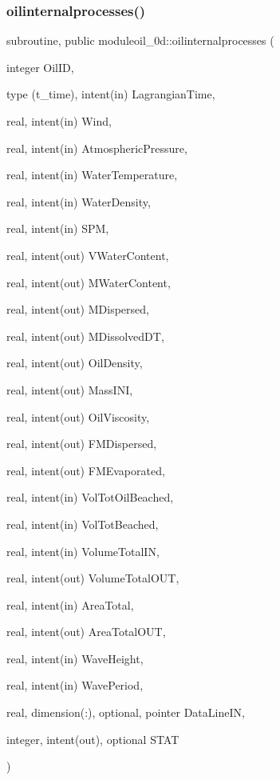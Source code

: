 \subsubsection{\texorpdfstring{oilinternalprocesses()}{oilinternalprocesses()}}
{\footnotesize\ttfamily subroutine, public moduleoil\+\_\+0d\+::oilinternalprocesses (\begin{DoxyParamCaption}\item[{integer}]{Oil\+ID,  }\item[{type (t\+\_\+time), intent(in)}]{Lagrangian\+Time,  }\item[{real, intent(in)}]{Wind,  }\item[{real, intent(in)}]{Atmospheric\+Pressure,  }\item[{real, intent(in)}]{Water\+Temperature,  }\item[{real, intent(in)}]{Water\+Density,  }\item[{real, intent(in)}]{S\+PM,  }\item[{real, intent(out)}]{V\+Water\+Content,  }\item[{real, intent(out)}]{M\+Water\+Content,  }\item[{real, intent(out)}]{M\+Dispersed,  }\item[{real, intent(out)}]{M\+Dissolved\+DT,  }\item[{real, intent(out)}]{Oil\+Density,  }\item[{real, intent(out)}]{Mass\+I\+NI,  }\item[{real, intent(out)}]{Oil\+Viscosity,  }\item[{real, intent(out)}]{F\+M\+Dispersed,  }\item[{real, intent(out)}]{F\+M\+Evaporated,  }\item[{real, intent(in)}]{Vol\+Tot\+Oil\+Beached,  }\item[{real, intent(in)}]{Vol\+Tot\+Beached,  }\item[{real, intent(in)}]{Volume\+Total\+IN,  }\item[{real, intent(out)}]{Volume\+Total\+O\+UT,  }\item[{real, intent(in)}]{Area\+Total,  }\item[{real, intent(out)}]{Area\+Total\+O\+UT,  }\item[{real, intent(in)}]{Wave\+Height,  }\item[{real, intent(in)}]{Wave\+Period,  }\item[{real, dimension(\+:), optional, pointer}]{Data\+Line\+IN,  }\item[{integer, intent(out), optional}]{S\+T\+AT }\end{DoxyParamCaption})}


